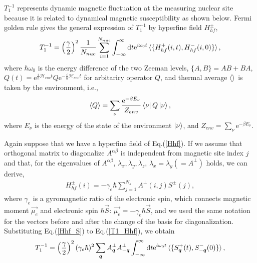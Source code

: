 $T^{-1}_1$ represents dynamic magnetic fluctuation at the measuring nuclear site because it is related to dynamical magnetic susceptibility as shown below.
Fermi golden rule gives the general expression of $T^{-1}_1$ by hyperfine field $H^{\pm}_{hf}$,
\begin{align}
\label{T1_Hhf}
T^{-1}_1 = \left(\frac{\gamma}{2}\right)^2\frac{1}{N_{nuc}}\sum^{N_{nuc}}_{i = 1}\int^{\infty}_{-\infty}\mathrm{d}t\mathrm{e}^{i\omega_0t}\braket{\{H^+_{hf}(i,t),H^-_{hf}(i,0)\}},
\end{align}
where $\hbar\omega_0$ is the energy difference of the two Zeeman levels, $\{A, B\} = AB + BA$,
$Q (t) = \mathrm{e}^{\frac{i}{\hbar}\mathcal{H}_{env}t}Q\mathrm{e}^{-\frac{i}{\hbar}\mathcal{H}_{env}t}$ for arbitariry operator $Q$,
and thermal average $\braket{}$ is taken by the environment, i.e.,
\begin{align}
\braket{Q} = \sum_{\nu}\frac{\mathrm{e}^{-\beta E_{\nu}}}{Z_{env}}\bra{\nu}Q\ket{\nu},
\end{align}
where $E_{\nu}$ is the energy of the state of the environment $\ket{\nu}$, and $Z_{env} = \sum_{\nu} \mathrm{e}^{-\beta E_{\nu}}$.
\begin{comment}
NMR relaxation rate $T^{-1}_1$ is propotional to thermal average of time-correlation function of spin components perpendicular
to the applied external magnetic field.
It can be related to dynamical susceptibility through
\end{comment}
Again suppose that we have a hyperfine field of Eq.(\ref{Hhf}).
If we assume that orthogonal matrix to diagonalize $A^{\alpha\beta}$ is independent from magnetic site index $j$ and
that, for the eigenvalues of $A^{\alpha\beta}$, $\lambda_x, \lambda_y, \lambda_z$, $\lambda_x = \lambda_y (= A^{\perp})$ holds,
we can derive,
\begin{align}
\label{Hhf_S}
H^\pm_{hf}(i) = -\gamma_e\hbar\sum^{N_s}_{j = 1}A^{\perp}(i, j)S^\pm(j),
\end{align}
where $\gamma_e$ is a gyromagnetic ratio of the electronic spin, which connects magnetic moment $\vec{\mu_e}$ and electronic spin $\hbar\vec{S}$: $\vec{\mu_e} = -\gamma_e\hbar\vec{S}$,
and we used the same notation for the vectors before and after the change of the basis for diagonalization.
Substituting Eq.(\ref{Hhf_S}) to Eq.(\ref{T1_Hhf}), we obtain
\begin{align}
\label{T1_Sq}
T^{-1}_1 = \left(\frac{\gamma}{2}\right)^2(\gamma_e\hbar)^2\sum_{\bm{q}}A^{\perp}_{\bm{q}}A^\perp_{-\bm{q}}\int^{\infty}_{-\infty}\mathrm{d}t\mathrm{e}^{i\omega_0t}
\braket{\{S^+_{\bm{q}}(t),S^-_{-\bm{q}}(0)\}},
\end{align}
